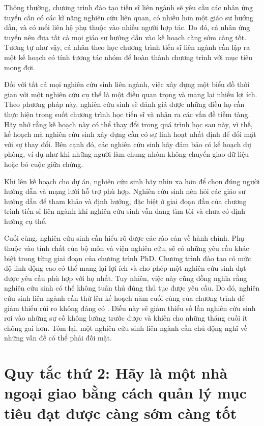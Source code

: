 \documentclass[12pt]{report}
\begin{document}
Thông thường, chương trình đào tạo tiến sĩ liên ngành sẽ yêu cầu các nhân ứng tuyển cần có các kĩ năng nghiên cứu liên quan, có nhiều hơn một giáo sư hướng dẫn, và có mối liên hệ phụ thuộc vào nhiều người hợp tác. Do đó, cá nhân ứng tuyển nên đưa tất cả mọi giáo sư hướng dẫn vào kế hoạch càng sớm càng tốt. Tương tự như vậy, cá nhân theo học chương trình tiến sĩ liên ngành cần lập ra một kế hoạch có tính tương tác nhóm để hoàn thành chương trình với mục tiêu mong đợi. 

Đối với tất cả mọi nghiên cứu sinh liên ngành, việc xây dựng một biểu đồ thời gian với một nghiên cứu cụ thể là một điều quan trọng và mang lại nhiều lợi ích. Theo phương pháp này, nghiên cứu sinh sẽ đánh giá được những điều họ cần thực hiện trong suốt chương trình học tiến sĩ và nhận ra các vấn đề tiềm tàng. Hãy nhớ rằng kế hoạch này có thể thay đổi trong quá trình học sau này, vì thế, kế hoạch mà nghiên cứu sinh xây dựng cần có sự linh hoạt nhất định để đối mặt với sự thay đổi. Bên cạnh đó, các nghiên cứu sinh hãy đảm bảo có kế hoạch dự phòng, ví dụ như khi những người làm chung nhóm không chuyển giao dữ liệu hoặc bỏ cuộc giữa chừng.

Khi lên kế hoạch cho dự án, nghiên cứu sinh hãy nhìn xa hơn để chọn đúng người hướng dẫn và mạng lưới hỗ trợ phù hợp. Nghiên cứu sinh nên hỏi các giáo sư hướng dẫn để tham khảo và định hướng, đặc biệt ở giai đoạn đầu của chương trình tiến sĩ liên ngành khi nghiên cứu sinh vẫn đang tìm tòi và chưa có định hướng cụ thể.

Cuối cùng, nghiên cứu sinh cần hiểu rõ được các rào cản về hành chính. Phụ thuộc vào tính chất của bộ môn và viện nghiên cứu, sẽ có những yêu cầu khác biệt trong từng giai đoạn của chương trình PhD. Chương trình đào tạo có mức độ linh động cao có thể mang lại lợi ích và cho phép một nghiên cứu sinh đạt được yêu cầu phù hợp với họ nhất. Tuy nhiên, việc này cũng đồng nghĩa rằng nghiên cứu sinh có thể không tuân thủ đúng thủ tục được yêu cầu. Do đó, nghiên cứu sinh liên ngành cần thử lên kế hoạch năm cuối cùng của chương trình để giảm thiểu rủi ro không đáng có \cite{8}. Điều này sẽ giảm thiểu số lần nghiên cứu sinh rơi vào những sự cố không lường trước được và khiến cho những tháng cuối ít chông gai hơn. Tóm lại, một nghiên cứu sinh liên ngành cần chủ động nghĩ về những vấn đề có thể phải đối mặt.

\section{Quy tắc thứ 2: Hãy là một nhà ngoại giao bằng cách quản lý mục tiêu đạt được càng sớm càng tốt}
\end{document}
